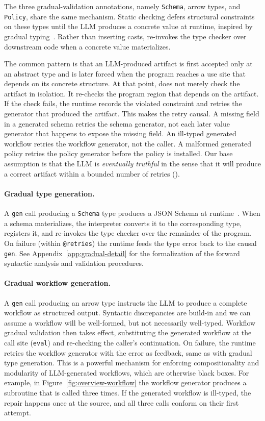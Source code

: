 The three gradual-validation annotations, namely \texttt{Schema},
arrow types, and \texttt{Policy}, share the same mechanism. Static
checking defers structural constraints on these types until the LLM
produces a concrete value at runtime, inspired by gradual
typing~\cite{siek2006gradual}. Rather than inserting
casts, \pact{} re-invokes the type checker over downstream code when a
concrete value materializes.

The common pattern is that an LLM-produced artifact is first accepted
only at an abstract type and is later forced when the program reaches a
use site that depends on its concrete structure. At that point, \pact{}
does not merely check the artifact in isolation. It re-checks the
program region that depends on the artifact. If the check fails, the
runtime records the violated constraint and retries the generator that
produced the artifact. This makes the retry causal. A missing field in a
generated schema retries the schema generator, not each later value
generator that happens to expose the missing field. An ill-typed
generated workflow retries the workflow generator, not the caller. A
malformed generated policy retries the policy generator before the
policy is installed. Our base assumption is that the LLM is \emph{eventually
truthful} in the sense that it will produce a correct artifact within a bounded
number of retries ().

\paragraph{Gradual type generation.} A \texttt{gen} call producing a
\texttt{Schema} type produces a JSON Schema at runtime~\cite{jsonschema2020}. 
When a schema materializes, the
interpreter converts it to the corresponding \pact{} type, registers it, and
re-invokes the type checker over the remainder of the program. On failure
(within \texttt{@retries}) the runtime feeds the type error back to the causal
\texttt{gen}. See Appendix~\ref{app:gradual-detail} for the formalization
of the forward syntactic analysis and validation procedures.

\paragraph{Gradual workflow generation.} A \texttt{gen} call producing an arrow
type instructs the LLM to produce a complete \pact{} workflow as structured
output. Syntactic discrepancies are build-in and we can assume a \pact workflow will
be well-formed, but not necessarily well-typed. Workflow gradual validation then
takes effect, substituting the generated workflow at the call site (\texttt{eval}) and re-checking the caller's
continuation. On failure, the runtime retries the workflow generator with the error as feedback,
same as with gradual type generation. This is a powerful mechanism for
enforcing compositionality and modularity of LLM-generated workflows, which are otherwise black boxes. 
For example, in Figure~\ref{fig:overview-workflow} the workflow generator produces a subroutine that is called three times. 
If the generated workflow is ill-typed, the repair happens once at the source,
and all three calls conform on their first attempt. 

